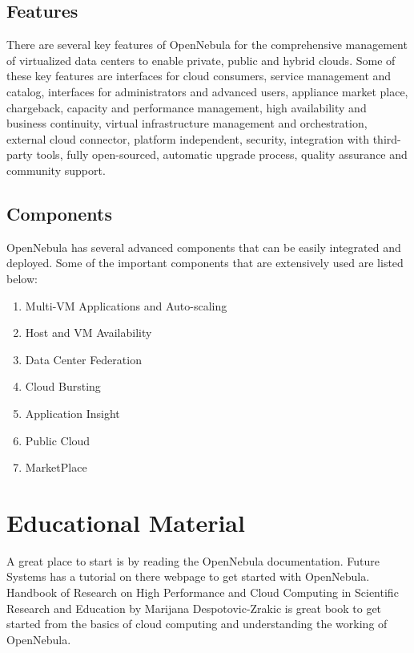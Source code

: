 \documentclass[9pt,twocolumn,twoside]{styles/osajnl}
\newcommand{\TODO}[2][]{\todo[color=red!10,inline,#1]{#2}}
\newcommand{\TE}{\TODO{Term}}
\begin{document}
\subsection{Features}
There are several key {features of 
OpenNebula}\cite{www-features-opennebula} for the comprehensive 
management of virtualized data centers to enable private, public and 
hybrid clouds. Some of these key features are interfaces for cloud 
consumers, service management and catalog, interfaces for 
administrators and advanced users, appliance market place, 
chargeback, capacity and performance management, high availability 
and business continuity, virtual infrastructure management and 
orchestration, external cloud connector, platform independent, 
security, integration with third-party tools, fully open-sourced, 
automatic upgrade process, quality assurance and community support.

\subsection{Components}

OpenNebula has several {advanced components}\cite{www-components} 
that can be easily 
integrated and deployed. Some of the important components that are 
extensively used are listed below:

\begin{enumerate}
	
	\item Multi-VM Applications and Auto-scaling
	\item Host and VM Availability
	\item Data Center Federation
	\item Cloud Bursting
	\item Application Insight
	\item Public Cloud
	\item MarketPlace
	
\end{enumerate}

\section{Educational Material}

A great place to start is by reading the {OpenNebula
  documentation}\cite{www-opennebula-documentation}.  {Future Systems
  has a tutorial on there \TE webpage}\cite{www-opennebula-tutorial}
to get started with OpenNebula. {Handbook of Research on High
  Performance and Cloud Computing in Scientific Research and
  Education}\cite{book-hpc} by Marijana Despotovic-Zrakic is great \TE
\TODO{"great" is subjective} book to get started from the basics of
cloud computing and understanding the working of OpenNebula.
\end{document}
